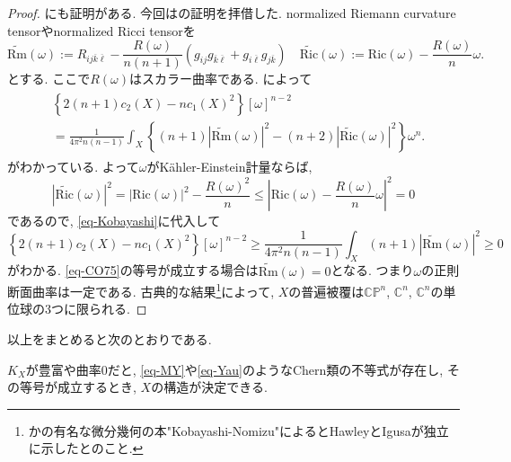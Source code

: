 \documentclass[dvipdfmx]{msjproc}
\theoremstyle{definition}
\newcommand{\C}{\mathbb{C}}
\begin{document}
 \begin{proof}
 \cite[Section 4]{Kob14}にも証明がある. 今回は\cite[Section 3]{Hisa24}の証明を拝借した.
normalized Riemann curvature tensorやnormalized Ricci tensorを
\[
\widetilde{\mathrm{Rm}}(\omega) := R_{ij\overline{k}\overline{\ell}} - \frac{R(\omega)}{n(n+1)} \left(g_{ij}g_{\overline{k}\overline{\ell}} + g_{i\overline{\ell}}g_{j\overline{k}}\right) \quad
\widetilde{\mathrm{Ric}}(\omega) := \mathrm{Ric}(\omega) - \frac{R(\omega)}{n} \omega. 
\]
とする. ここで$R(\omega)$はスカラー曲率である. 
\cite{CO75}によって
\begin{align}
\begin{split}
\label{eq-Kobayashi}
&\left\{ 2(n+1)c_2(X) - n c_1(X)^2 \right\} [\omega]^{n-2} \\
&= \frac{1}{4\pi^2 n(n-1)} \int_X \left\{ (n+1) \left|\widetilde{\mathrm{Rm}}(\omega)\right|^2 - (n+2)\left|\widetilde{\mathrm{Ric}}(\omega)\right|^2 \right\} \omega^n.
\end{split}
\end{align}
がわかっている. よって$\omega$がK\"ahler-Einstein計量ならば, 
\[
\left|\widetilde{\mathrm{Ric}}(\omega)\right|^2 = \left|\mathrm{Ric}(\omega)\right|^2 - \frac{R(\omega)^2}{n} \leq \left|\mathrm{Ric}(\omega) - \frac{R(\omega)}{n}\omega \right|^2
=0
\]
であるので, \eqref{eq-Kobayashi}に代入して
\[
\left\{ 2(n+1)c_2(X) - n c_1(X)^2 \right\} [\omega]^{n-2} 
\geq 
\frac{1}{4\pi^2 n(n-1)} \int_X (n+1) \left|\widetilde{\mathrm{Rm}}(\omega)\right|^2 
\ge 0
\]
がわかる. \eqref{eq-CO75}の等号が成立する場合は$\widetilde{\mathrm{Rm}}(\omega) =0$となる.
つまり$\omega$の正則断面曲率は一定である. 古典的な結果\footnote{かの有名な微分幾何の本"Kobayashi-Nomizu"によるとHawleyとIgusaが独立に示したとのこと. }によって, $X$の普遍被覆は$\C\mathbb{P}^n$, $\C^n$, $\C^n$の単位球の3つに限られる. 
 \end{proof}



以上をまとめると次のとおりである. 
\begin{screen}
$K_X$が豊富や曲率0だと, \eqref{eq-MY}や\eqref{eq-Yau}のようなChern類の不等式が存在し, 
その等号が成立するとき, $X$の構造が決定できる. 
\end{screen}
\end{document}
